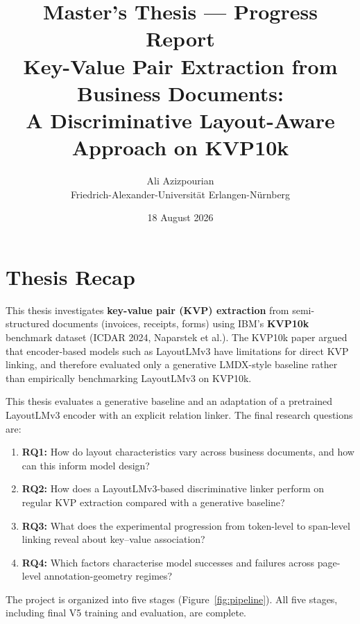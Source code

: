 \documentclass[11pt,a4paper]{article}
\title{\textbf{Master's Thesis --- Progress Report}\\[6pt]
\large Key-Value Pair Extraction from Business Documents:\\
A Discriminative Layout-Aware Approach on KVP10k}
\author{Ali Azizpourian\\[2pt]
\small Friedrich-Alexander-Universit\"at Erlangen-N\"urnberg}
\date{18 August 2026}
\begin{document}
\maketitle
\thispagestyle{fancy}

\section{Thesis Recap}

This thesis investigates \textbf{key-value pair (KVP) extraction} from semi-structured documents (invoices, receipts, forms) using IBM's \textbf{KVP10k} benchmark dataset (ICDAR 2024, Naparstek et al.).
The KVP10k paper argued that encoder-based models such as LayoutLMv3 have limitations for direct KVP linking, and therefore evaluated only a generative LMDX-style baseline rather than empirically benchmarking LayoutLMv3 on KVP10k.

This thesis evaluates a generative baseline and an adaptation of a pretrained
LayoutLMv3 encoder with an explicit relation linker. The final research questions are:

\begin{enumerate}[nosep]
  \item \textbf{RQ1:} How do layout characteristics vary across business documents, and how can this inform model design?
  \item \textbf{RQ2:} How does a LayoutLMv3-based discriminative linker perform on regular KVP extraction compared with a generative baseline?
  \item \textbf{RQ3:} What does the experimental progression from token-level to span-level linking reveal about key--value association?
  \item \textbf{RQ4:} Which factors characterise model successes and failures across page-level annotation-geometry regimes?
\end{enumerate}

The project is organized into five stages (Figure~\ref{fig:pipeline}).
All five stages, including final V5 training and evaluation, are complete.
\end{document}
